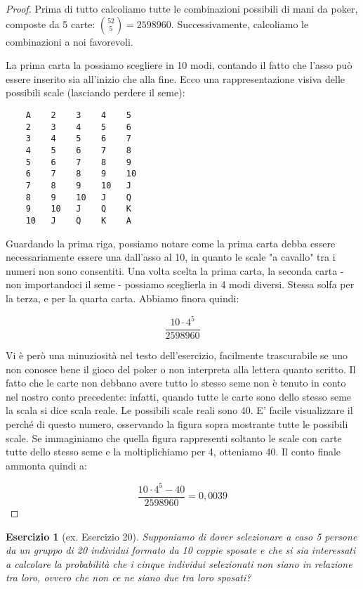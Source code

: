 \documentclass[12pt]{article}
\newtheorem{theorem}{Esercizio}
\begin{document}
\begin{proof}
	Prima di tutto calcoliamo tutte le combinazioni possibili di mani da poker, composte da 5 carte: $\binom{52}{5} = 2598960$. Successivamente, calcoliamo le combinazioni a noi favorevoli.
	
	La prima carta la possiamo scegliere in 10 modi, contando il fatto che l'asso può essere inserito sia all'inizio che alla fine. Ecco una rappresentazione visiva delle possibili scale (lasciando perdere il seme):
	
	\begin{verbatim}
    A    2    3    4    5    
    2    3    4    5    6
    3    4    5    6    7
    4    5    6    7    8
    5    6    7    8    9
    6    7    8    9    10
    7    8    9    10   J
    8    9    10   J    Q
    9    10   J    Q    K
    10   J    Q    K    A
	\end{verbatim}
	
	Guardando la prima riga, possiamo notare come la prima carta debba essere necessariamente essere una dall'asso al 10, in quanto le scale "a cavallo" tra i numeri non sono consentiti. Una volta scelta la prima carta, la seconda carta - non importandoci il seme - possiamo sceglierla in 4 modi diversi. Stessa solfa per la terza, e per la quarta carta. Abbiamo finora quindi:
	
	\[
		\frac{10 \cdot 4^5}{2598960}
	\]
	
	Vi è però una minuziosità nel testo dell'esercizio, facilmente trascurabile se uno non conosce bene il gioco del poker o non interpreta alla lettera quanto scritto. Il fatto che le carte non debbano avere tutto lo stesso seme non è tenuto in conto nel nostro conto precedente: infatti, quando tutte le carte sono dello stesso seme la scala si dice scala reale. Le possibili scale reali sono 40. E' facile visualizzare il perché di questo numero, osservando la figura sopra mostrante tutte le possibili scale. Se immaginiamo che quella figura rappresenti soltanto le scale con carte tutte dello stesso seme e la moltiplichiamo per 4, otteniamo 40. Il conto finale ammonta quindi a:
	
	\[
		\frac{10 \cdot 4^5 - 40}{2598960} = 0,0039
	\]
	
\end{proof}

\begin{theorem}[ex. Esercizio 20]
	Supponiamo di dover selezionare a caso 5 persone da un gruppo di 20 individui formato da 10 coppie sposate e che si sia interessati a calcolare la probabilità che i cinque individui selezionati non siano in relazione tra loro, ovvero che non ce ne siano due tra loro sposati?
\end{theorem}
\end{document}
